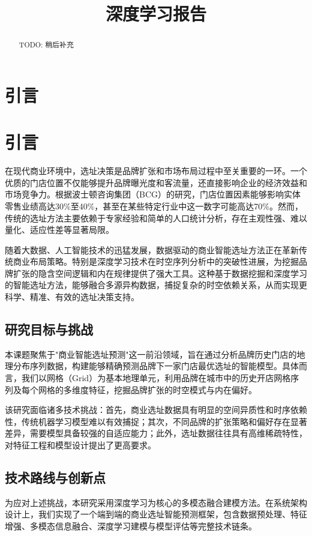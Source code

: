 \documentclass{article}
\title{深度学习报告}
\begin{document}
\maketitle

\begin{abstract}
      TODO: 稍后补充
\end{abstract}

\newpage

\tableofcontents
\newpage
\section{引言}

\section{引言}

在现代商业环境中，选址决策是品牌扩张和市场布局过程中至关重要的一环。一个优质的门店位置不仅能够提升品牌曝光度和客流量，还直接影响企业的经济效益和市场竞争力。根据波士顿咨询集团（BCG）的研究，门店位置因素能够影响实体零售业绩高达30\%至40\%，甚至在某些特定行业中这一数字可能高达70\%。然而，传统的选址方法主要依赖于专家经验和简单的人口统计分析，存在主观性强、难以量化、适应性差等显著局限。

随着大数据、人工智能技术的迅猛发展，数据驱动的商业智能选址方法正在革新传统商业布局策略。特别是深度学习技术在时空序列分析中的突破性进展，为挖掘品牌扩张的隐含空间逻辑和内在规律提供了强大工具。这种基于数据挖掘和深度学习的智能选址方法，能够融合多源异构数据，捕捉复杂的时空依赖关系，从而实现更科学、精准、有效的选址决策支持。

\subsection{研究目标与挑战}
本课题聚焦于"商业智能选址预测"这一前沿领域，旨在通过分析品牌历史门店的地理分布序列数据，构建能够精确预测品牌下一家门店最优选址的智能模型。具体而言，我们以网格（Grid）为基本地理单元，利用品牌在城市中的历史开店网格序列及每个网格的多维度特征，挖掘品牌扩张的时空模式与内在偏好。

该研究面临诸多技术挑战：首先，商业选址数据具有明显的空间异质性和时序依赖性，传统机器学习模型难以有效捕捉；其次，不同品牌的扩张策略和偏好存在显著差异，需要模型具备较强的自适应能力；此外，选址数据往往具有高维稀疏特性，对特征工程和模型设计提出了更高要求。

\subsection{技术路线与创新点}
为应对上述挑战，本研究采用深度学习为核心的多模态融合建模方法。在系统架构设计上，我们实现了一个端到端的商业选址智能预测框架，包含数据预处理、特征增强、多模态信息融合、深度学习建模与模型评估等完整技术链条。
\end{document}
